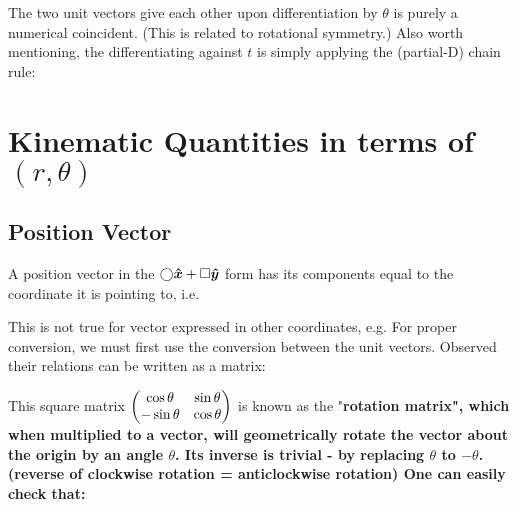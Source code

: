 \documentclass[class=article, crop=false, 12pt]{standalone}
\begin{document}
The two unit vectors give each other upon differentiation by $\theta$ is purely a numerical coincident. 
(This is related to rotational symmetry.) 
Also worth mentioning, 
the differentiating against $t$  is simply applying the (partial-D) chain rule:





\linesep
\section{Kinematic Quantities in terms of $(r,\theta)$}

\subsection{Position Vector}


A position vector in the $\bigcirc\vu*{x} + \square\vu*{y}$ form has its components equal to the coordinate it is pointing to, i.e.

This is not true for vector expressed in other coordinates, 
e.g. 
For proper conversion, we must first use the conversion between the unit vectors. 
Observed their relations can be written as a matrix:

This square matrix $\begin{pmatrix} \cos\theta & \sin\theta \\ -\sin\theta & \cos\theta \end{pmatrix}$ is known as the "\bf{rotation matrix}", 
which when multiplied to a vector, 
will geometrically rotate the vector about the origin by an angle $\theta$. 
Its inverse is trivial - 
by replacing $\theta$ to $-\theta$. 
(reverse of clockwise rotation = anticlockwise rotation)
One can easily check that:
\end{document}
